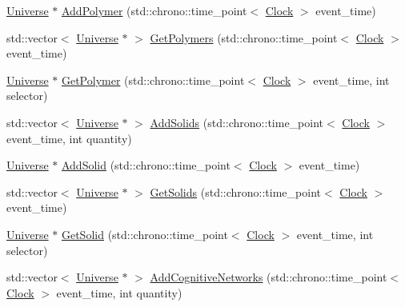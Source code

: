 \begin{DoxyCompactItemize}
\item 
\mbox{\hyperlink{classUniverse}{Universe}} $\ast$ \mbox{\hyperlink{classUniverse_a4ea0af5d2eb7b5070a83f7da29526fbd}{Add\+Polymer}} (std\+::chrono\+::time\+\_\+point$<$ \mbox{\hyperlink{universe_8h_a0ef8d951d1ca5ab3cfaf7ab4c7a6fd80}{Clock}} $>$ event\+\_\+time)
\item 
std\+::vector$<$ \mbox{\hyperlink{classUniverse}{Universe}} $\ast$ $>$ \mbox{\hyperlink{classUniverse_aac5d1c1a3a3ba56c8ca7115a85b2c239}{Get\+Polymers}} (std\+::chrono\+::time\+\_\+point$<$ \mbox{\hyperlink{universe_8h_a0ef8d951d1ca5ab3cfaf7ab4c7a6fd80}{Clock}} $>$ event\+\_\+time)
\item 
\mbox{\hyperlink{classUniverse}{Universe}} $\ast$ \mbox{\hyperlink{classUniverse_a2d5d3924a7d7ffd2a5f47be9f137d86e}{Get\+Polymer}} (std\+::chrono\+::time\+\_\+point$<$ \mbox{\hyperlink{universe_8h_a0ef8d951d1ca5ab3cfaf7ab4c7a6fd80}{Clock}} $>$ event\+\_\+time, int selector)
\item 
std\+::vector$<$ \mbox{\hyperlink{classUniverse}{Universe}} $\ast$ $>$ \mbox{\hyperlink{classUniverse_a410d5ba2224fe90584b1f1aa5b38b41c}{Add\+Solids}} (std\+::chrono\+::time\+\_\+point$<$ \mbox{\hyperlink{universe_8h_a0ef8d951d1ca5ab3cfaf7ab4c7a6fd80}{Clock}} $>$ event\+\_\+time, int quantity)
\item 
\mbox{\hyperlink{classUniverse}{Universe}} $\ast$ \mbox{\hyperlink{classUniverse_a598799e2fcdf9ed60e83e9f5a61bfc05}{Add\+Solid}} (std\+::chrono\+::time\+\_\+point$<$ \mbox{\hyperlink{universe_8h_a0ef8d951d1ca5ab3cfaf7ab4c7a6fd80}{Clock}} $>$ event\+\_\+time)
\item 
std\+::vector$<$ \mbox{\hyperlink{classUniverse}{Universe}} $\ast$ $>$ \mbox{\hyperlink{classUniverse_a669fc068dd7820a5af309bfbe67199aa}{Get\+Solids}} (std\+::chrono\+::time\+\_\+point$<$ \mbox{\hyperlink{universe_8h_a0ef8d951d1ca5ab3cfaf7ab4c7a6fd80}{Clock}} $>$ event\+\_\+time)
\item 
\mbox{\hyperlink{classUniverse}{Universe}} $\ast$ \mbox{\hyperlink{classUniverse_a9f7b74fc21d45ddaa78aa18e9a337bcd}{Get\+Solid}} (std\+::chrono\+::time\+\_\+point$<$ \mbox{\hyperlink{universe_8h_a0ef8d951d1ca5ab3cfaf7ab4c7a6fd80}{Clock}} $>$ event\+\_\+time, int selector)
\item 
std\+::vector$<$ \mbox{\hyperlink{classUniverse}{Universe}} $\ast$ $>$ \mbox{\hyperlink{classUniverse_a5199f6c27b1a97c8b8c9847b8be686cf}{Add\+Cognitive\+Networks}} (std\+::chrono\+::time\+\_\+point$<$ \mbox{\hyperlink{universe_8h_a0ef8d951d1ca5ab3cfaf7ab4c7a6fd80}{Clock}} $>$ event\+\_\+time, int quantity)

\end{DoxyCompactItemize}
